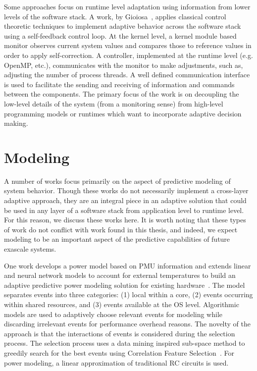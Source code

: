     Some approaches focus on runtime level adaptation using information from lower levels of the software stack. A work, by Gioiosa~\cite{GioiosaEtAl2014}, applies classical control theoretic techniques to implement adaptive behavior across the software stack using a self-feedback control loop. At the kernel level, a kernel module based monitor observes current system values and compares those to reference values in order to apply self-correction. A controller, implemented at the runtime level (e.g. OpenMP, etc.), communicates with the monitor to make adjustments, such as, adjusting the number of process threads. A well defined communication interface is used to facilitate the sending and receiving of information and commands between the components. The primary focus of the work is on decoupling the low-level details of the system (from a monitoring sense) from high-level programming models or runtimes which want to incorporate adaptive decision making.

\section{Modeling}
    A number of works focus primarily on the aspect of predictive modeling of system behavior. Though these works do not necessarily implement a cross-layer adaptive approach, they are an integral piece in an adaptive solution that could be used in any layer of a software stack from application level to runtime level. For this reason, we discuss these works here. It is worth noting that these types of work do not conflict with work found in this thesis, and indeed, we expect modeling to be an important aspect of the predictive capabilities of future exascale systems.
    
    One work develops a power model based on PMU information and extends linear and neural network models to account for external temperatures to build an adaptive predictive power modeling solution for existing hardware~\cite{AhmadEtAl2015}. The model separates events into three categories: (1) local within a core, (2) events occurring within shared resources, and (3) events available at the OS level. Algorithmic models are used to adaptively choose relevant events for modeling while discarding irrelevant events for performance overhead reasons. The novelty of the approach is that the interactions of events is considered during the selection process. The selection process uses a data mining inspired sub-space method to greedily search for the best events using Correlation Feature Selection~\cite{HallHolmes2003}. For power modeling, a linear approximation of traditional RC circuits is used.

